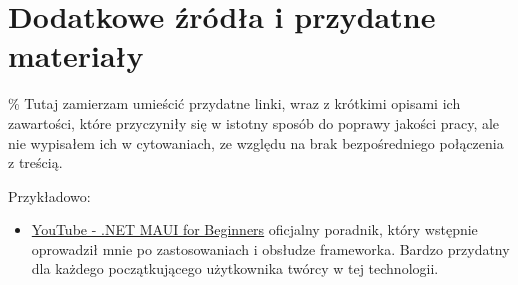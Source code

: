\section{Dodatkowe źródła i przydatne materiały}
\% Tutaj zamierzam umieścić przydatne linki, wraz z krótkimi opisami ich zawartości,
które przyczyniły się w istotny sposób do poprawy jakości pracy, ale nie wypisałem ich w cytowaniach,
ze względu na brak bezpośredniego połączenia z treścią.

Przykładowo:

\begin{itemize}
    \item \href{https://www.youtube.com/playlist?list=PLdo4fOcmZ0oUBAdL2NwBpDs32zwGqb9DY}{YouTube - .NET MAUI for Beginners} 
        oficjalny poradnik, który wstępnie oprowadził mnie po zastosowaniach i obsłudze frameworka.
        Bardzo przydatny dla każdego początkującego użytkownika twórcy w tej technologii.
\end{itemize}
